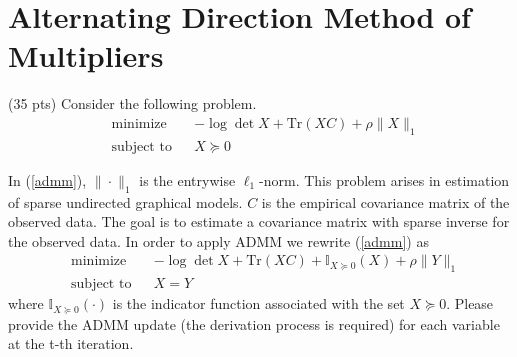 \section{Alternating Direction Method of Multipliers}
{\color{red} (35 pts)} Consider the following problem.
\begin{equation}
\begin{aligned}
\label{admm}
& \text{minimize }
& & -\log \det X + \text{Tr}(XC) + \rho\|X\|_1 \\
& \text{subject to}
& & X \succeq 0
\end{aligned}
\end{equation}

In (\ref{admm}), \(\| \cdot \|_1\) is the entrywise \(\ell_1\)-norm. This problem arises in estimation of sparse undirected graphical models. \( C \) is the empirical covariance matrix of the observed data. The goal is to estimate a covariance matrix with sparse inverse for the observed data. In order to apply ADMM we rewrite (\ref{admm}) as
\begin{equation}
\begin{aligned}
& \text{minimize }
& & -\log \det X + \text{Tr}(XC) + \mathbb{I}_{X \succeq 0}(X) + \rho\|Y\|_1\\
& \text{subject to}
& &  X = Y
\end{aligned}
\end{equation}
where $\mathbb{I}_{X \succeq 0}(\cdot)$ is the indicator function associated with the set $X \succeq 0$. Please provide the ADMM update (the derivation process is required) for each variable at the t-th iteration.

\solution{}










\newpage